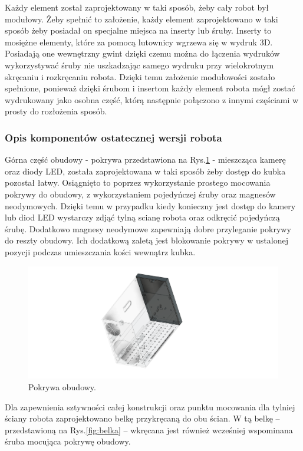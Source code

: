Każdy element został zaprojektowany w taki sposób, żeby cały robot był modułowy. Żeby spełnić to założenie, każdy element
zaprojektowano w taki sposób żeby posiadał on specjalne miejsca na inserty lub śruby. Inserty to mosiężne elementy, które za pomocą lutownicy wgrzewa się
w wydruk 3D. Posiadają one wewnętrzny gwint dzięki czemu można do łączenia wydruków wykorzystywać śruby nie uszkadzając samego wydruku przy 
wielokrotnym skręcaniu i rozkręcaniu robota. Dzięki temu założenie modułowości zostało spełnione, ponieważ dzięki śrubom i insertom każdy element robota 
mógł zostać wydrukowany jako osobna część, którą następnie połączono z innymi częściami w prosty do rozłożenia sposób.

\subsubsection{Opis komponentów ostatecznej wersji robota}

Górna część obudowy - pokrywa przedstawiona na Rys.\ref{fig:pokrywa} - mieszcząca kamerę oraz diody LED, została zaprojektowana w taki sposób żeby dostęp do kubka pozostał łatwy. Osiągnięto to
poprzez wykorzystanie prostego mocowania pokrywy do obudowy, z wykorzystaniem pojedyńczej śruby oraz magnesów neodymowych. Dzięki temu w przypadku kiedy konieczny 
jest dostęp do kamery lub diod LED wystarczy zdjąć tylną scianę robota oraz odkręcić pojedyńczą śrubę. Dodatkowo magnesy neodymowe zapewniają
dobre przyleganie pokrywy do reszty obudowy. Ich dodatkową zaletą jest blokowanie pokrywy w ustalonej pozycji podczas umieszczania kości wewnątrz
kubka.

\begin{figure}[H]
    \centering
    \includegraphics[width=0.95\linewidth]{chapters/03-praca-wlasna/figures/pokrywa.png}
    \caption{\label{fig:pokrywa}Pokrywa obudowy.}
\end{figure}

Dla zapewnienia sztywności całej konstrukcji oraz punktu mocowania dla tylniej ściany robota zaprojektowano belkę przykręcaną do obu ścian. W tą belkę -- przedstawioną na Rys.\ref{fig:belka} --
wkręcana jest również wcześniej wspominana śruba mocująca pokrywę obudowy.

